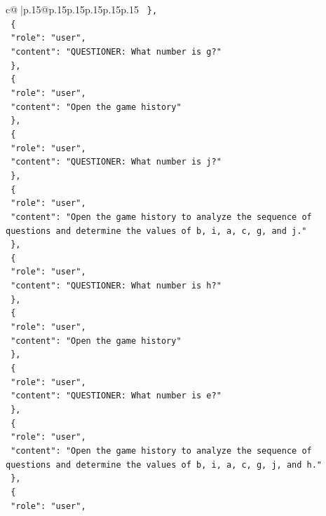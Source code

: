 \documentclass{article}
\begin{document}
{\begin{supertabular}{c@{$\;$}|p{.15\linewidth}@{}p{.15\linewidth}p{.15\linewidth}p{.15\linewidth}p{.15\linewidth}p{.15\linewidth}}
{{{\texttt{  \},} \\
\texttt{  \{} \\
\texttt{    "role": "user",} \\
\texttt{    "content": "QUESTIONER: What number is g?"} \\
\texttt{  \},} \\
\texttt{  \{} \\
\texttt{    "role": "user",} \\
\texttt{    "content": "Open the game history"} \\
\texttt{  \},} \\
\texttt{  \{} \\
\texttt{    "role": "user",} \\
\texttt{    "content": "QUESTIONER: What number is j?"} \\
\texttt{  \},} \\
\texttt{  \{} \\
\texttt{    "role": "user",} \\
\texttt{    "content": "Open the game history to analyze the sequence of questions and determine the values of b, i, a, c, g, and j."} \\
\texttt{  \},} \\
\texttt{  \{} \\
\texttt{    "role": "user",} \\
\texttt{    "content": "QUESTIONER: What number is h?"} \\
\texttt{  \},} \\
\texttt{  \{} \\
\texttt{    "role": "user",} \\
\texttt{    "content": "Open the game history"} \\
\texttt{  \},} \\
\texttt{  \{} \\
\texttt{    "role": "user",} \\
\texttt{    "content": "QUESTIONER: What number is e?"} \\
\texttt{  \},} \\
\texttt{  \{} \\
\texttt{    "role": "user",} \\
\texttt{    "content": "Open the game history to analyze the sequence of questions and determine the values of b, i, a, c, g, j, and h."} \\
\texttt{  \},} \\
\texttt{  \{} \\
\texttt{    "role": "user",} \\
}}}
\end{supertabular}}
\end{document}
